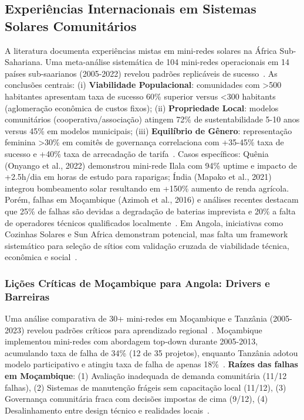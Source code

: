 \documentclass[12pt, a4paper]{article}
\begin{document}
\subsection{Experiências Internacionais em Sistemas Solares Comunitários}
A literatura documenta experiências mistas em mini-redes solares na África Sub-Sahariana. Uma meta-análise sistemática de 104 mini-redes operacionais em 14 países sub-saarianos (2005-2022) revelou padrões replicáveis de sucesso~\citep{Duran2021}. As conclusões centrais: (i) 
\textbf{Viabilidade Populacional}: comunidades com >500 habitantes apresentam taxa de sucesso 60\% superior versus <300 habitants (aglomeração econômica de custos fixos); (ii) 
\textbf{Propriedade Local}: modelos comunitários (cooperativa/associação) atingem 72\% de sustentabilidade 5-10 anos versus 45\% em modelos municipais; (iii) 
\textbf{Equilíbrio de Gênero}: representação feminina >30\% em comitês de governança correlaciona com +35-45\% taxa de sucesso e +40\% taxa de arrecadação de tarifa~\citep{Clancy2021, Cecelski2020}. Casos específicos: Quênia (Onyango et al., 2022) demonstrou mini-rede Ilala com 94\% uptime e impacto de +2.5h/dia em horas de estudo para raparigas; Índia (Mapako et al., 2021) integrou bombeamento solar resultando em +150\% aumento de renda agrícola. Porém, falhas em Moçambique (Azimoh et al., 2016) e análises recentes destacam que 25\% de falhas são devidas a degradação de baterias imprevista e 20\% a falta de operadores técnicos qualificados localmente~\citep{Duran2021}. Em Angola, iniciativas como Cozinhas Solares e Sun Africa demonstram potencial, mas falta um framework sistemático para seleção de sítios com validação cruzada de viabilidade técnica, econômica e social~\citep{SunAfrica2023}.

\subsubsection{Lições Críticas de Moçambique para Angola: Drivers e Barreiras}

Uma análise comparativa de 30+ mini-redes em Moçambique e Tanzânia (2005-2023) revelou padrões críticos para aprendizado regional~\citep{Ahlborg2014, Broto2018}. Moçambique implementou mini-redes com abordagem top-down durante 2005-2013, acumulando taxa de falha de 34\% (12 de 35 projetos), enquanto Tanzânia adotou modelo participativo e atingiu taxa de falha de apenas 18\%~\citep{Ahlborg2014}. \textbf{Raízes das falhas em Moçambique}: (1) Avaliação inadequada de demanda comunitária (11/12 falhas), (2) Sistemas de manutenção frágeis sem capacitação local (11/12), (3) Governança comunitária fraca com decisões impostas de cima (9/12), (4) Desalinhamento entre design técnico e realidades locais~\citep{Broto2018}. 
\end{document}
